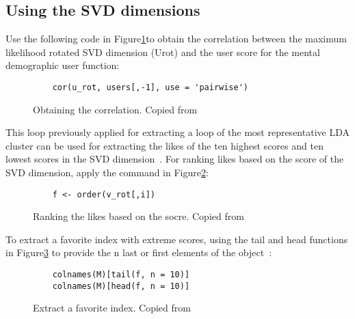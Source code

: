 \subsection{Using the SVD dimensions~\cite{hid515-12}}

Use the following code in Figure\ref{F:obtain}to 
obtain the correlation between the maximum 
likelihood rotated SVD dimension (Urot) and the user score for the
 mental demographic user function:

\begin{figure}[htb]
\begin{footnotesize}
\begin{verbatim}
    cor(u_rot, users[,-1], use = 'pairwise')
\end{verbatim}
\end{footnotesize}
\caption{Obtaining the correlation. Copied from~\cite{hid515-12}}
\label{F:obtain}
\end{figure}


This loop previously applied for extracting a loop of the most 
representative LDA cluster can be used for extracting the likes 
of the ten highest scores and ten lowest scores in the SVD 
dimension~\cite{hid515-12}.
 For ranking likes based on the score of the SVD dimension, 
apply the command in Figure\ref{F:rank}:

\begin{figure}[htb]
\begin{footnotesize}
\begin{verbatim}
    f <- order(v_rot[,i])
\end{verbatim}
\end{footnotesize}
\caption{Ranking the likes based on the socre. 
Copied from~\cite{hid515-12}}
\label{F:rank}
\end{figure}


To extract a favorite index with extreme scores, using the tail 
and head functions in Figure\ref{F:extractindex} to provide the n last or 
first elements of the 
object~\cite{hid515-12}:

\begin{figure}[htb]
\begin{footnotesize}
\begin{verbatim}
    colnames(M)[tail(f, n = 10)]
    colnames(M)[head(f, n = 10)]
\end{verbatim}
\end{footnotesize}
\caption{Extract a favorite index. Copied from~\cite{hid515-12}}
\label{F:extractindex}
\end{figure}


